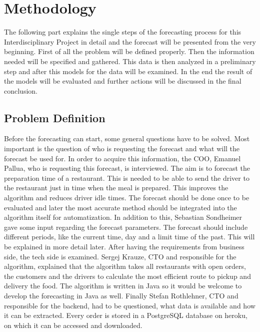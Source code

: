 \chapter{Methodology}\label{chapter:Methodology}
The following part explains the single steps of the forecasting process for this Interdisciplinary Project in detail and the forecast will be presented from the very beginning.\newline
First of all the problem will be defined properly. Then the information needed will be specified and gathered. This data is then analyzed in a preliminary step and after this models for the data will be examined. In the end the result of the models will be evaluated and further actions will be discussed in the final conclusion.
\section{Problem Definition}\label{section:Problem Definition}
Before the forecasting can start, some general questions have to be solved. Most important is the question of who is requesting the forecast and what will the forecast be used for. In order to acquire this information, the COO, Emanuel Pallua, who is requesting this forecast, is interviewed. The aim is to forecast the preparation time of a restaurant. This is needed to be able to send the driver to the restaurant just in time when the meal is prepared. This improves the algorithm and reduces driver idle times. The forecast should be done once to be evaluated and later the most accurate method should be integrated into the algorithm itself for automatization. In addition to this, Sebastian Sondheimer gave some input regarding the forecast parameters. The forecast should include different periods, like the current time, day and a limit time of the past. This will be explained in more detail later.\newline
After having the requirements from business side, the tech side is examined. Sergej Krauze, CTO and responsible for the algorithm, explained that the algorithm takes all restaurants with open orders, the customers and the drivers to calculate the most efficient route to pickup and delivery the food. The algorithm is written in Java so it would be welcome to develop the forecasting in Java as well. Finally Stefan Rothlehner, CTO and responsible for the backend, had to be questioned, what data is available and how it can be extracted. Every order is stored in a PostgreSQL database on heroku, on which it can be accessed and downloaded.
